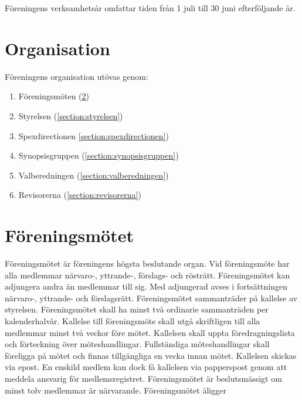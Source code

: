 \documentclass[a4paper]{article}
\begin{document}
Föreningens verksamhetsår omfattar tiden från 1 juli till 30 juni efterföljande år.

\section{Organisation}
Föreningens organisation utövas genom:

\begin{enumerate}
  \item Föreningsmöten (\ref{section:föreningsmötet})
  \item Styrelsen (\ref{section:styrelsen})
  \item Spexdirectionen \ref{section:spexdirectionen})
  \item Synopsisgruppen (\ref{section:synopsisgruppen})
  \item Valberedningen (\ref{section:valberedningen})
  \item Revisorerna (\ref{section:revisorerna})
\end{enumerate}

\section{Föreningsmötet}
\label{section:föreningsmötet}
Föreningsmötet är föreningens högsta beslutande organ.\newline
\newline
Vid föreningsmöte har alla medlemmar närvaro-, yttrande-, förslags- och rösträtt. Föreningsmötet kan adjungera andra än medlemmar till sig. Med adjungerad avses i fortsättningen närvaro-, yttrande- och förslagsrätt.\newline
\newline
Föreningsmötet sammanträder på kallelse av styrelsen. Föreningsmötet skall ha minst två ordinarie sammanträden per kalenderhalvår.\newline
\newline
Kallelse till föreningsmöte skall utgå skriftligen till alla medlemmar minst två veckor före mötet. Kallelsen skall uppta föredragningslista och förteckning över möteshandlingar. Fullständiga möteshandlingar skall föreligga på mötet och finnas tillgängliga en vecka innan mötet.\newline
\newline
Kallelsen skickas via epost. En enskild medlem kan dock få kallelsen via papperspost genom att meddela ansvarig för medlemsregistret.\newline
\newline
Föreningsmötet är beslutsmässigt om minst tolv medlemmar är närvarande.\newline
\newline
Föreningsmötet åligger
\end{document}
